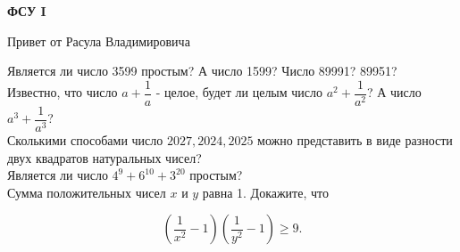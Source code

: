 \centerline{\bf \Huge ФСУ I}

\begin{flushright}
        \scriptsize{Привет от Расула Владимировича}
\end{flushright}

Является ли число 3599 простым? А число 1599? Число 89991? 89951?\\

Известно, что число $a+\dfrac{1}{a}$ - целое, будет ли целым число $a^2+\dfrac{1}{a^2}$? А число $a^3+\dfrac{1}{a^3}$?\\


Сколькими способами число $2027,2024,2025$ можно представить в виде разности двух квадратов натуральных чисел?\\


Является ли число $4^9+6^{10}+3^{20}$ простым?\\

Сумма положительных чисел $x$ и $y$ равна 1. Докажите, что

$$
\left(\frac{1}{x^2}-1\right)\left(\frac{1}{y^2}-1\right) \geq 9 .
$$
